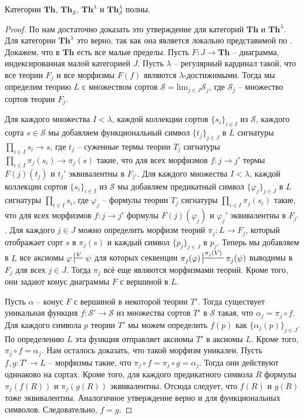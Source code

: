 \documentclass[reqno]{amsart}
\theoremstyle{definition}
\theoremstyle{remark}
\newcommand{\bcat}[1]{\mathbf{#1}}
\newcommand{\fs}[1]{\mathrm{#1}}
\newcommand{\Th}{\bcat{Th}}
\begin{document}
\begin{prop}[th-limits]
Категории $\Th$, $\Th_\mathcal{S}$, $\Th^\lambda$ и $\Th_\mathcal{S}^\lambda$ полны.
\end{prop}
\begin{proof}
По  нам достаточно доказать это утверждение для категорий $\Th$ и $\Th^\lambda$.
Для категории $\Th^\lambda$ это верно, так как она является локально представимой по .
Докажем, что в $\Th$ есть все малые пределы.
Пусть $F : J \to \Th$ -- диаграмма, индексированная малой категорией $J$.
Пусть $\lambda$ -- регулярный кардинал такой, что все теории $F_j$ и все морфизмы $F(f)$ являются $\lambda$-достижимыми.
Тогда мы определим теорию $L$ с множеством сортов $\mathcal{S} = \fs{lim}_{j \in J} \mathcal{S}_j$, где $\mathcal{S}_j$ -- множество сортов теории $F_j$.

Для каждого множества $I < \lambda$, каждой коллекции сортов $\{ s_i \}_{i \in I}$ из $\mathcal{S}$, каждого сорта $s \in \mathcal{S}$ мы добавляем функциональный символ $\{ t_j \}_{j \in J}$ в $L$ сигнатуры $\prod_{i \in I} s_i \to s$,
где $t_j$ -- суженные термы теории $T_j$ сигнатуры $\prod_{i \in I} \pi_j(s_i) \to \pi_j(s)$ такие, что для всех морфизмов $f : j \to j'$ термы $F(j)(t_j)$ и $t_j'$ эквивалентны в $F_{j'}$.
Для каждого множества $I < \lambda$, каждой коллекции сортов $\{ s_i \}_{i \in I}$ из $\mathcal{S}$ мы добавляем предикатный символ $\{ \varphi_j \}_{j \in J}$ в $L$ сигнатуры $\prod_{i \in I} s_i$,
где $\varphi_j$ -- формулы теории $T_j$ сигнатуры $\prod_{i \in I} \pi_j(s_i)$ такие, что для всех морфизмов $f : j \to j'$ формулы $F(j)(\varphi_j)$ и $\varphi_j'$ эквивалентны в $F_{j'}$.
Для каждого $j \in J$ можно определить морфизм теорий $\pi_j : L \to F_j$, который отображает сорт $s$ в $\pi_j(s)$ и каждый символ $\{ p_j \}_{j \in J}$ в $p_j$.
Теперь мы добавляем в $L$ все аксиомы $\varphi \sststile{}{V} \psi$ для которых секвенции $\pi_j(\varphi) \sststile{}{\pi_j(V)} \pi_j(\psi)$ выводимы в $F_j$ для всех $j \in J$.
Тогда $\pi_j$ всё еще являются морфизмами теорий.
Кроме того, они задают конус диаграммы $F$ с вершиной в $L$.

Пусть $\alpha$ -- конус $F$ с вершиной в некоторой теории $T'$.
Тогда существует уникальная функция $f : \mathcal{S}' \to \mathcal{S}$ из множества сортов $T'$ в $\mathcal{S}$ такая, что $\alpha_j = \pi_j \circ f$.
Для каждого символа $p$ теории $T'$ мы можем определить $f(p)$ как $\{ \alpha_j(p) \}_{j \in J}$.
По определению $L$ эта функция отправляет аксиомы $T'$ в аксиомы $L$.
Кроме того, $\pi_j \circ f = \alpha_j$.
Нам осталось доказать, что такой морфизм уникален.
Пусть $f,g : T' \to L$ -- морфизмы такие, что $\pi_j \circ f = \pi_j \circ g = \alpha_j$.
Тогда они действуют одинаково на сортах.
Кроме того, для каждого предикатного символа $R$ формулы $\pi_j(f(R))$ и $\pi_j(g(R))$ эквивалентны.
Отсюда следует, что $f(R)$ и $g(R)$ тоже эквивалентны.
Аналогичное утверждение верно и для функциональных символов.
Следовательно, $f = g$.
\end{proof}
\end{document}
